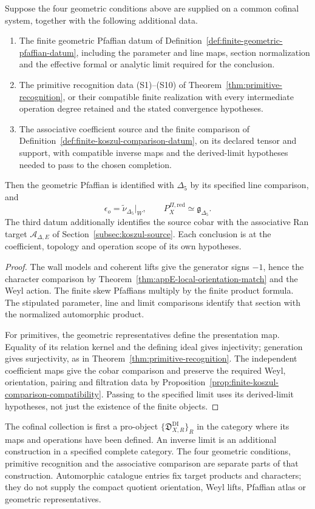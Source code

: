 \begin{theorem}
\label{thm:pfaffian-dirac-conditional}
Suppose the four geometric conditions above are supplied on a common
cofinal system, together with the following additional data.
\begin{enumerate}
\item The finite geometric Pfaffian datum of
  Definition~\ref{def:finite-geometric-pfaffian-datum}, including the
  parameter and line maps, section normalization and the effective
  formal or analytic limit required for the conclusion.
\item The primitive recognition data \textup{(S1)}--\textup{(S10)}
  of Theorem~\ref{thm:primitive-recognition}, or their compatible
  finite realization with every intermediate operation degree
  retained and the stated convergence hypotheses.
\item The associative coefficient source and the finite comparison
  of Definition~\ref{def:finite-koszul-comparison-datum}, on its
  declared tensor and support, with compatible inverse maps and the
  derived-limit hypotheses needed to pass to the chosen completion.
\end{enumerate}
Then the geometric Pfaffian is identified with \(\Delta_5\) by its
specified line comparison, and
\[
 \epsilon_o=\widetilde\nu_{\Delta_5}|_W,
 \qquad
 P_X^{\Pi,\mathrm{red}}\simeq\mathfrak g_{\Delta_5}.
\]
The third datum additionally identifies the source cobar with the
associative Ran target \(\mathcal A_{\Delta,E}\) of
Section~\ref{subsec:koszul-source}. Each conclusion is at the
coefficient, topology and operation scope of its own hypotheses.
\end{theorem}
\begin{proof}
The wall models and coherent lifts give the generator signs
\(-1\), hence the character comparison by
Theorem~\ref{thm:appE-local-orientation-match} and the Weyl action.
The finite skew Pfaffians multiply by the finite product formula.
The stipulated parameter, line and limit comparisons identify that
section with the normalized automorphic product.

For primitives, the geometric representatives define the
presentation map. Equality of its relation kernel and the defining
ideal gives injectivity; generation gives surjectivity, as in
Theorem~\ref{thm:primitive-recognition}. The independent coefficient
maps give the cobar comparison and preserve the required Weyl,
orientation, pairing and filtration data by
Proposition~\ref{prop:finite-koszul-comparison-compatibility}.
Passing to the specified limit uses its derived-limit hypotheses,
not just the existence of the finite objects.
\end{proof}

The cofinal collection is first a pro-object
\(\{\mathfrak D_{X,R}^{\mathrm{DI}}\}_R\) in the category where
its maps and operations have been defined. An inverse limit is an
additional construction in a specified complete category. The
four geometric conditions, primitive recognition and the
associative comparison are separate parts of that construction.
Automorphic catalogue entries fix target products and characters;
they do not supply the compact quotient orientation, Weyl lifts,
Pfaffian atlas or geometric representatives.
